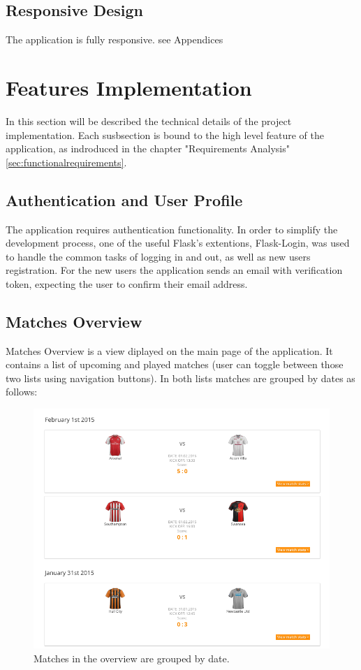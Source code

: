 \subsection{Responsive Design}
The application is fully responsive. 
see Appendices


\section{Features Implementation}
In this section will be described the technical details of the project implementation. Each susbsection is bound to the high level feature of the application, as indroduced in the chapter "Requirements Analysis" \ref{sec:functionalrequirements}.

\subsection{Authentication and User Profile}

The application requires authentication functionality. In order to simplify the development process, one of the useful Flask's extentions, Flask-Login, was used to handle the common tasks of logging in and out, as well as new users registration. For the new users the application sends an email with verification token, expecting the user to confirm their email address. 

\subsection{Matches Overview}
Matches Overview is a view diplayed on the main page of the application. It contains a list of upcoming and played matches (user can toggle between those two lists using navigation buttons). In both lists matches are grouped by dates as follows:

\begin{figure}[H]
	\begin{center}
		\includegraphics[width=.90\linewidth,natwidth=610,natheight=642]{impl/images/matchesGrouped}
		\caption{Matches in the overview are grouped by date.} \label{fig:using:matchesgrouped}
	\end{center}
\end{figure}
 
